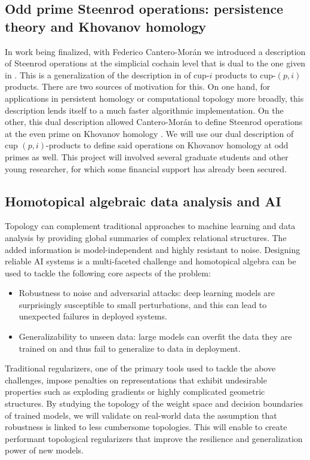 \subsection{Odd prime Steenrod operations: persistence theory and Khovanov homology} \label{ss:odd prime steenrod operations}

In work being finalized, with Federico Cantero-Mor\'{a}n we introduced a description of Steenrod operations at the simplicial cochain level that is dual to the one given in \cite{medina2021maysteenrod}.
This is a generalization of the description in \cite{medina2021newformulas} of cup-$i$ products to cup-$(p,i)$ products.
There are two sources of motivation for this.
On one hand, for applications in persistent homology or computational topology more broadly, this description lends itself to a much faster algorithmic implementation.
On the other, this dual description allowed Cantero-Mor\'an to define Steenrod operations at the even prime on Khovanov homology \cite{cantero-moran2020khovanov}.
We will use our dual description of cup $(p,i)$-products to define said operations on Khovanov homology at odd primes as well.
This project will involved several graduate students and other young researcher, for which some financial support has already been secured.

\subsection{Homotopical algebraic data analysis and AI} \label{ss:ai}

Topology can complement traditional approaches to machine learning and data analysis by providing global summaries of complex relational structures.
The added information is model-independent and highly resistant to noise.
Designing reliable AI systems is a multi-faceted challenge and homotopical algebra can be used to tackle the following core aspects of the problem:

\begin{itemize}
	\item Robustness to noise and adversarial attacks: deep learning models are surprisingly susceptible to small perturbations, and this can lead to unexpected failures in deployed systems.
	\item Generalizability to unseen data: large models can overfit the data they are trained on and thus fail to generalize to data in deployment.
\end{itemize}
Traditional regularizers, one of the primary tools used to tackle the above challenges, impose penalties on representations that exhibit undesirable properties such as exploding gradients or highly complicated geometric structures.
By studying the topology of the weight space and decision boundaries of trained models, we will validate on real-world data the assumption that robustness is linked to less cumbersome topologies.
This will enable to create performant topological regularizers that improve the resilience and generalization power of new models.

